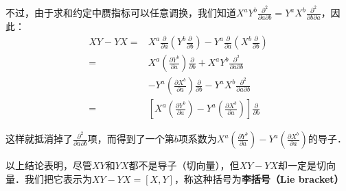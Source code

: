 不过，由于求和约定中赝指标可以任意调换，我们知道$X^aY^b\frac{\partial^2}{\partial a\partial b}=Y^aX^b\frac{\partial^2}{\partial b\partial a}$，因此：
\begin{equation}
\begin{aligned}
XY-YX=&X^a\frac{\partial}{\partial a}(Y^b\frac{\partial}{\partial b})-Y^a\frac{\partial}{\partial a}(X^b\frac{\partial}{\partial b})\\
=&X^a(\frac{\partial Y^b}{\partial a})\frac{\partial}{\partial b}+X^aY^b\frac{\partial^2}{\partial a\partial b}\\&-Y^a(\frac{\partial X^b}{\partial a})\frac{\partial}{\partial b}-Y^aX^b\frac{\partial^2}{\partial a\partial b}\\
=&[X^a(\frac{\partial Y^b}{\partial a})-Y^a(\frac{\partial X^b}{\partial a})]\frac{\partial}{\partial b}
\end{aligned}
\end{equation}

这样就抵消掉了$\frac{\partial^2}{\partial a\partial b}$项，而得到了一个第$b$项系数为$X^a(\frac{\partial Y^b}{\partial a})-Y^a(\frac{\partial X^b}{\partial a})$的导子．

以上结论表明，尽管$XY$和$YX$都不是导子（切向量），但$XY-YX$却一定是切向量．我们把它表示为$XY-YX=[X, Y]$，称这种括号为\textbf{李括号（Lie bracket）}

